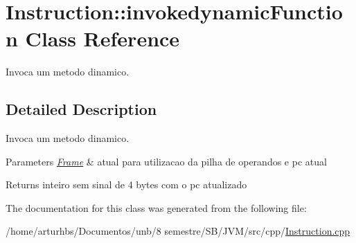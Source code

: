 \hypertarget{classInstruction_1_1invokedynamicFunction}{}\section{Instruction\+:\+:invokedynamic\+Function Class Reference}
\label{classInstruction_1_1invokedynamicFunction}


Invoca um metodo dinamico.  




\subsection{Detailed Description}
Invoca um metodo dinamico. 


\begin{DoxyParams}{Parameters}
{\em \hyperlink{classFrame}{Frame}} & atual para utilizacao da pilha de operandos e pc atual \\
\hline
\end{DoxyParams}
\begin{DoxyReturn}{Returns}
inteiro sem sinal de 4 bytes com o pc atualizado 
\end{DoxyReturn}


The documentation for this class was generated from the following file\+:\begin{DoxyCompactItemize}
\item 
/home/arturhbs/\+Documentos/unb/8 semestre/\+S\+B/\+J\+V\+M/src/cpp/\hyperlink{Instruction_8cpp}{Instruction.\+cpp}\end{DoxyCompactItemize}
